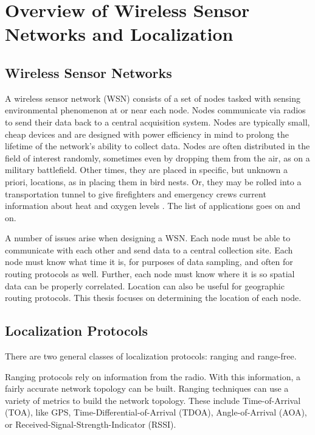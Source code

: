 \chapter{Overview of Wireless Sensor Networks and Localization}
\section{Wireless Sensor Networks}

A wireless sensor network (WSN) consists of a set of nodes tasked with sensing environmental phenomenon at or near each node.  Nodes communicate via radios to send their data back to a central acquisition system.  Nodes are typically small, cheap devices and are designed with power efficiency in mind to prolong the lifetime of the network's ability to collect data.  Nodes are often distributed in the field of interest randomly, sometimes even by dropping them from the air, as on a military battlefield.  Other times, they are placed in specific, but unknown a priori, locations, as in placing them in bird nests\cite{birds}.  Or, they may be rolled into a transportation tunnel to give firefighters and emergency crews current information about heat and oxygen levels \cite{runes}.  The list of applications goes on and on.

A number of issues arise when designing a WSN.  Each node must be able to communicate with each other and send data to a central collection site.  Each node must know what time it is, for purposes of data sampling, and often for routing protocols as well.  Further, each node must know where it is so spatial data can be properly correlated.  Location can also be useful for geographic routing protocols.  This thesis focuses on determining the location of each node.

\section{Localization Protocols}

There are two general classes of localization protocols: ranging and range-free.  

Ranging protocols rely on information from the radio. With this information, a fairly accurate network topology can be built.  Ranging techniques can use a variety of metrics to build the network topology.  These include Time-of-Arrival (TOA), like GPS\cite{Wellenhoff},  Time-Differential-of-Arrival (TDOA)\cite{Savvides}, Angle-of-Arrival (AOA)\cite{Niculescu}, or Received-Signal-Strength-Indicator (RSSI)\cite{Patwari}.  

